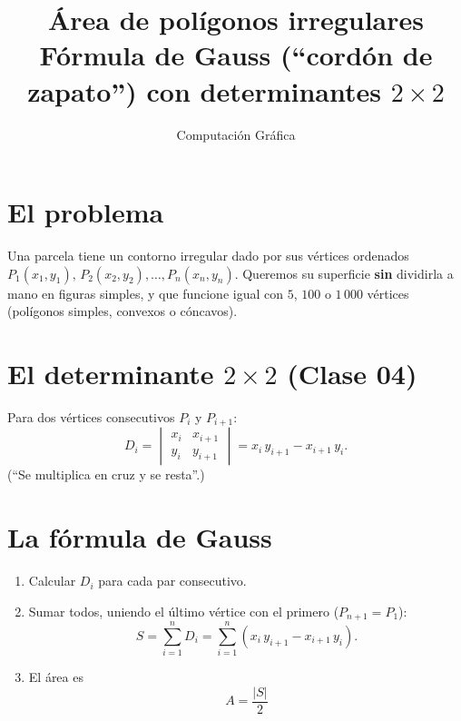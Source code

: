 ﻿\documentclass[11pt,a4paper]{article}
\title{\'Area de pol\'igonos irregulares\\ F\'ormula de Gauss (``cord\'on de zapato'') con determinantes $2\times2$}
\author{Computaci\'on Gr\'afica}
\date{}
\begin{document}
\maketitle

\section{El problema}
Una parcela tiene un contorno irregular dado por sus v\'ertices ordenados
$P_1(x_1,y_1),\,P_2(x_2,y_2),\dots,P_n(x_n,y_n)$. Queremos su superficie
\textbf{sin} dividirla a mano en figuras simples, y que funcione igual con
$5$, $100$ o $1\,000$ v\'ertices (pol\'igonos simples, convexos o c\'oncavos).

\section{El determinante $2\times 2$ (Clase 04)}
Para dos v\'ertices consecutivos $P_i$ y $P_{i+1}$:
\[
D_i=\begin{vmatrix} x_i & x_{i+1} \\ y_i & y_{i+1} \end{vmatrix}
= x_i\,y_{i+1}-x_{i+1}\,y_i .
\]
(``Se multiplica en cruz y se resta''.)

\section{La f\'ormula de Gauss}
\begin{enumerate}
  \item Calcular $D_i$ para cada par consecutivo.
  \item Sumar todos, uniendo el \'ultimo v\'ertice con el primero ($P_{n+1}=P_1$):
  \[
  S=\sum_{i=1}^{n} D_i=\sum_{i=1}^{n}\left(x_i\,y_{i+1}-x_{i+1}\,y_i\right).
  \]
  \item El \'area es
  \[
  \boxed{A=\frac{|S|}{2}}
  \]
\end{enumerate}
\end{document}
